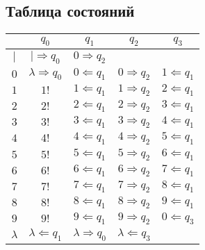\documentclass[titlepage,paper=a4,pagesize,draft]{scrartcl}
\begin{document}
\subsection{Таблица состояний}
\begin{tabular}{|c|c|c|c|c|}
\hline
 & $q_0$ & $q_1$ & $q_2$ & $q_3$\\
\hline
$|$ & $|\Rightarrow q_0$ & $0\Rightarrow q_2$ & & \\
$0$ & $\lambda\Rightarrow q_0$ & $0\Leftarrow q_1$ & $0\Rightarrow q_2$ & $1\Leftarrow q_1$\\
$1$ & $1 !$ & $1\Leftarrow q_1$ & $1\Rightarrow q_2$ & $2\Leftarrow q_1$\\
$2$ & $2 !$ & $2\Leftarrow q_1$ & $2\Rightarrow q_2$ & $3\Leftarrow q_1$\\
$3$ & $3 !$ & $3\Leftarrow q_1$ & $3\Rightarrow q_2$ & $4\Leftarrow q_1$\\
$4$ & $4 !$ & $4\Leftarrow q_1$ & $4\Rightarrow q_2$ & $5\Leftarrow q_1$\\
$5$ & $5 !$ & $5\Leftarrow q_1$ & $5\Rightarrow q_2$ & $6\Leftarrow q_1$\\
$6$ & $6 !$ & $6\Leftarrow q_1$ & $6\Rightarrow q_2$ & $7\Leftarrow q_1$\\
$7$ & $7 !$ & $7\Leftarrow q_1$ & $7\Rightarrow q_2$ & $8\Leftarrow q_1$\\
$8$ & $8 !$ & $8\Leftarrow q_1$ & $8\Rightarrow q_2$ & $9\Leftarrow q_1$\\
$9$ & $9 !$ & $9\Leftarrow q_1$ & $9\Rightarrow q_2$ & $0\Leftarrow q_3$\\
$\lambda$ & $\lambda\Leftarrow q_1$ & $\lambda\Rightarrow q_0$ & $\lambda\Leftarrow q_3$ & \\
\hline
\end{tabular}
\end{document}
